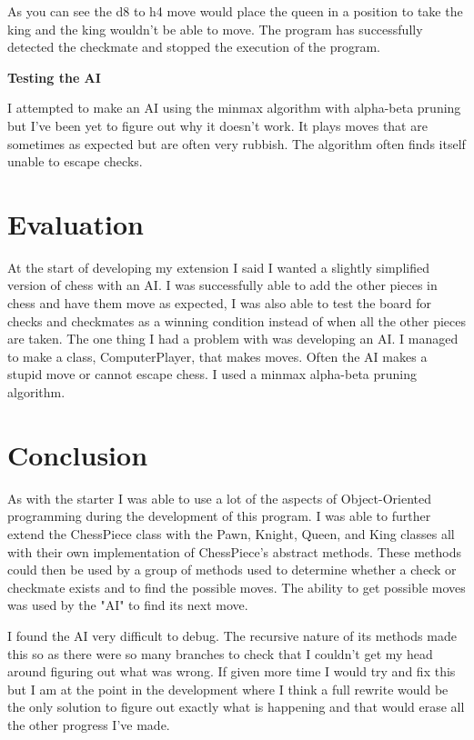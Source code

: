 \documentclass[a4paper]{article}
\begin{document}
As you can see the d8 to h4 move would place the queen in a position to take the king and the king wouldn't be able to move. The program has successfully detected the checkmate and stopped the execution of the program. \newline

\noindent \textbf{Testing the AI}

I attempted to make an AI using the minmax algorithm with alpha-beta pruning but I've been yet to figure out why it doesn't work. It plays moves that are sometimes as expected but are often very rubbish. The algorithm often finds itself unable to escape checks. 

\section*{Evaluation}

At the start of developing my extension I said I wanted a slightly simplified version of chess with an AI. I was successfully able to add the other pieces in chess and have them move as expected, I was also able to test the board for checks and checkmates as a winning condition instead of when all the other pieces are taken. The one thing I had a problem with was developing an AI. I managed to make a class, ComputerPlayer, that makes moves. Often the AI makes a stupid move or cannot escape chess. I used a minmax alpha-beta pruning algorithm.

\section*{Conclusion}

As with the starter I was able to use a lot of the aspects of Object-Oriented programming during the development of this program. I was able to further extend the ChessPiece class with the Pawn, Knight, Queen, and King classes all with their own implementation of ChessPiece's abstract methods. These methods could then be used by a group of methods used to determine whether a check or checkmate exists and to find the possible moves. The ability to get possible moves was used by the "AI" to find its next move.

I found the AI very difficult to debug. The recursive nature of its methods made this so as there were so many branches to check that I couldn't get my head around figuring out what was wrong. If given more time I would try and fix this but I am at the point in the development where I think a full rewrite would be the only solution to figure out exactly what is happening and that would erase all the other progress I've made.
\end{document}
